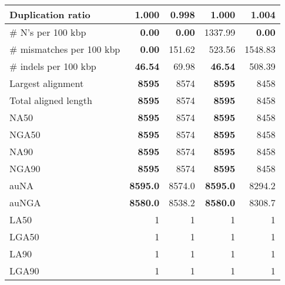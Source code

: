 \documentclass[12pt,a4paper]{article}
\begin{document}
\begin{table}[ht]
\begin{center}
\begin{tabular}{|l*{4}{|r}|}
Duplication ratio & 1.000 & {\bf 0.998} & 1.000 & 1.004 \\ \hline
\# N's per 100 kbp & {\bf 0.00} & {\bf 0.00} & 1337.99 & {\bf 0.00} \\ \hline
\# mismatches per 100 kbp & {\bf 0.00} & 151.62 & 523.56 & 1548.83 \\ \hline
\# indels per 100 kbp & {\bf 46.54} & 69.98 & {\bf 46.54} & 508.39 \\ \hline
Largest alignment & {\bf 8595} & 8574 & {\bf 8595} & 8458 \\ \hline
Total aligned length & {\bf 8595} & 8574 & {\bf 8595} & 8458 \\ \hline
NA50 & {\bf 8595} & 8574 & {\bf 8595} & 8458 \\ \hline
NGA50 & {\bf 8595} & 8574 & {\bf 8595} & 8458 \\ \hline
NA90 & {\bf 8595} & 8574 & {\bf 8595} & 8458 \\ \hline
NGA90 & {\bf 8595} & 8574 & {\bf 8595} & 8458 \\ \hline
auNA & {\bf 8595.0} & 8574.0 & {\bf 8595.0} & 8294.2 \\ \hline
auNGA & {\bf 8580.0} & 8538.2 & {\bf 8580.0} & 8308.7 \\ \hline
LA50 & 1 & 1 & 1 & 1 \\ \hline
LGA50 & 1 & 1 & 1 & 1 \\ \hline
LA90 & 1 & 1 & 1 & 1 \\ \hline
LGA90 & 1 & 1 & 1 & 1 \\ \hline
\end{tabular}
\end{center}
\end{table}
\end{document}
